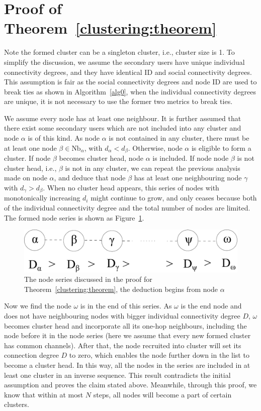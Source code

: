 \documentclass[10pt,journal,compsoc]{IEEEtran}
\makeatletter
\theoremstyle{mytheoremstyle}
\theoremstyle{mytheoremstyle}
\theoremstyle{mytheoremstyle}
\renewenvironment{proof}[1][\proofname]{%
      \par\pushQED{\qed}\fontfamily{ptm}\selectfont%
      \topsep6\p@\@plus6\p@\relax
      \trivlist\item[\hskip\labelsep\bfseries#1\@addpunct{.}]%
      \ignorespaces
    }{%
      \popQED\endtrivlist\@endpefalse
    }
\newcommand{\ie}{i.e., }
\makeatother
\begin{document}
\section*{Proof of Theorem~\ref{clustering:theorem}}
\label{proof_clustering:theorem}
\begin{proof}
Note the formed cluster can be a singleton cluster, \ie cluster size is 1.
To simplify the discussion, we assume the secondary users have unique individual connectivity degrees, and they have identical ID and social connectivity degrees.
This assumption is fair as the social connectivity degrees and node ID are used to break ties as shown in Algorithm~\ref{alg0}, when the individual connectivity degrees are unique, it is not necessary to use the former two metrics to break ties.

We assume every node has at least one neighbour.
It is further assumed that there exist some secondary users which are not included into any cluster and node $\alpha$ is of this kind.
As node $\alpha$ is not contained in any cluster, there must be at least one node $\beta\in \text{Nb}_\alpha$, with $d_{\alpha} < d_{\beta}$.
Otherwise, node $\alpha$ is eligible to form a cluster.
If node $\beta$ becomes cluster head, node $\alpha$ is included.
If node node $\beta$ is not cluster head, i.e., $\beta$ is not in any cluster, we can repeat the previous analysis made on node $\alpha$, and deduce that node $\beta$ has at least one neighbouring node $\gamma$ with $d_{\gamma}>d_{\beta}$.
When no cluster head appears, this series of nodes with monotonically increasing $d_i$ might continue to grow, and only ceases because both of the individual connectivity degree and the total number of nodes are limited.
The formed node series is shown as Figure~\ref{lemma1}.

\begin{figure}[ht!]
  \centering
\includegraphics[width=0.6\linewidth]{lemma1.pdf}
	\caption{The node series discussed in the proof for Theorem~\ref{clustering:theorem}, the deduction begins from node $\alpha$}
	\label{lemma1}
\end{figure}


Now we find the node $\omega$ is in the end of this series.
As $\omega$ is the end node and does not have neighbouring nodes with bigger individual connectivity degree $D$, $\omega$ becomes cluster head and incorporate all its one-hop neighbours, including the node before it in the node series (here we assume that every new formed cluster has common channels).
After that, the node recruited into cluster will set its connection degree $D$ to zero, which enables the node further down in the list to become a cluster head.
In this way, all the nodes in the series are included in at least one cluster in an inverse sequence.
This result contradicts the initial assumption and proves the claim stated above.
Meanwhile, through this proof, we know that within at most $N$ steps, all nodes will become a part of certain clusters.
\end{proof}
\end{document}
